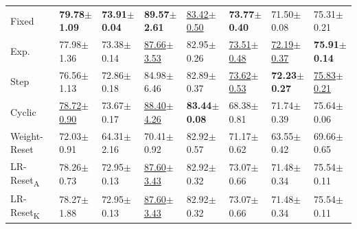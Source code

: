 \documentclass{article} %
\begin{document}
\begin{table}[b]
\begin{tabular}{llllllll}
      Fixed                     & \bfseries 79.78$\pm$1.09   & \bfseries 73.91$\pm$0.04 & \bfseries 89.57$\pm$2.61   & \underline{83.42$\pm$0.50} & \bfseries 73.77$\pm$0.40   & 71.50$\pm$0.08             & 75.31$\pm$0.21             \\
      Exp.                      & 77.98$\pm$1.36             & 73.38$\pm$0.14           & \underline{87.66$\pm$3.53} & 82.95$\pm$0.26             & \underline{73.51$\pm$0.48} & \underline{72.19$\pm$0.37} & \bfseries 75.91$\pm$0.14   \\
      Step                      & 76.56$\pm$1.13             & 72.86$\pm$0.18           & 84.98$\pm$6.46             & 82.89$\pm$0.37             & \underline{73.62$\pm$0.53} & \bfseries 72.23$\pm$0.27   & \underline{75.83$\pm$0.21} \\
      Cyclic                    & \underline{78.72$\pm$0.90} & 73.67$\pm$0.17           & \underline{88.40$\pm$4.26} & \bfseries 83.44$\pm$0.08   & 68.38$\pm$0.81             & 71.74$\pm$0.39             & 75.64$\pm$0.06             \\
      Weight-Reset              & 72.03$\pm$0.91             & 64.31$\pm$2.16           & 70.41$\pm$0.92             & 82.92$\pm$0.57             & 71.17$\pm$0.62             & 63.55$\pm$0.42             & 69.66$\pm$0.65             \\
      LR-Reset\textsubscript{A} & 78.26$\pm$0.73             & 72.95$\pm$0.13           & \underline{87.60$\pm$3.43} & 82.92$\pm$0.32             & 73.07$\pm$0.66             & 71.48$\pm$0.34             & 75.54$\pm$0.11             \\
      LR-Reset\textsubscript{K} & 78.27$\pm$1.88             & 72.95$\pm$0.13           & \underline{87.60$\pm$3.43} & 82.92$\pm$0.32             & 73.07$\pm$0.66             & 71.48$\pm$0.34             & 75.54$\pm$0.11             \\
      \bottomrule
   \end{tabular}
   \label{tab:lr_resetting}
\end{table}
\end{document}
